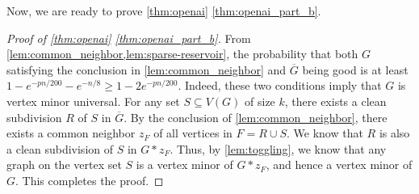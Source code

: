 \documentclass[reqno]{amsart}
\theoremstyle{definition}
\numberwithin{theorem}{section}
\renewcommand{\geq}{\ge}
\renewcommand{\ge}{\geqslant}
\begin{document}
Now, we are ready to prove \cref{thm:openai} \ref{thm:openai_part_b}.
\begin{proof}[Proof of \cref{thm:openai} \ref{thm:openai_part_b}]
From \cref{lem:common_neighbor,lem:sparse-reservoir}, the probability that both $G$ satisfying the conclusion in \cref{lem:common_neighbor} and $\overline{G}$ being good is at least $1-e^{-pn/200}-e^{-n/8}\geq 1-2e^{-pn/200}$. Indeed, these two conditions imply that $G$ is vertex minor universal. For any set $S\subseteq V(G)$ of size $k$, there exists a clean subdivision $R$ of $S$ in $\overline{G}$. By the conclusion of \cref{lem:common_neighbor}, there exists a common neighbor $z_F$ of all vertices in $F=R\cup S$. We know that $R$ is also a clean subdivision of $S$ in $G*z_F$. Thus, by \cref{lem:toggling}, we know that any graph on the vertex set $S$ is a vertex minor of $G*z_F$, and hence a vertex minor of $G$. This completes the proof.
\end{proof}
\end{document}
